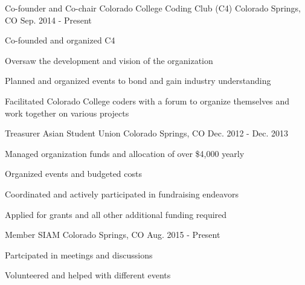 


\begin{cventries}


\cventry
{Co-founder and Co-chair} %
{Colorado College Coding Club (C4)} %
{Colorado Springs, CO} %
{Sep. 2014 - Present} %
{ %
\begin{cvitems}
\item {Co-founded and organized C4}
\item {Oversaw the development and vision of the organization}
\item {Planned and organized events to bond and gain industry understanding}
\item {Facilitated Colorado College coders with a forum to organize themselves and work together on various projects}
\end{cvitems}
}


\cventry
{Treasurer} %
{Asian Student Union} %
{Colorado Springs, CO} %
{Dec. 2012 - Dec. 2013} %
{ %
\begin{cvitems}
\item {Managed organization funds and allocation of over \$4,000 yearly}
\item {Organized events and budgeted costs}
\item {Coordinated and actively participated in fundraising endeavors}
\item {Applied for grants and all other additional funding required}
\end{cvitems}
}


\cventry
{Member} %
{SIAM} %
{Colorado Springs, CO} %
{Aug. 2015 - Present} %
{ %
\begin{cvitems}
\item {Partcipated in meetings and discussions}
\item {Volunteered and helped with different events}
\end{cvitems}
}


\end{cventries}
